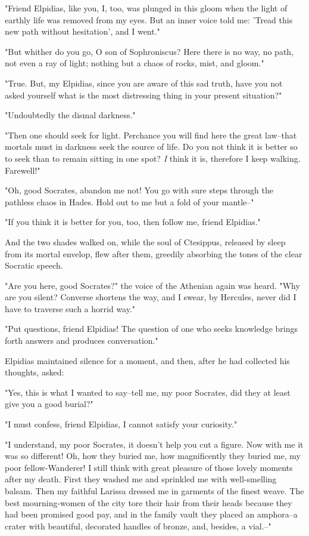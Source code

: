 "Friend Elpidias, like you, I, too, was plunged in this gloom when the
light of earthly life was removed from my eyes. But an inner voice
told me: 'Tread this new path without hesitation', and I went."

"But whither do you go, O son of Sophroniscus? Here there is no way,
no path, not even a ray of light; nothing but a chaos of rocks, mist,
and gloom."

"True. But, my Elpidias, since you are aware of this sad truth, have
you not asked yourself what is the most distressing thing in your
present situation?"

"Undoubtedly the dismal darkness."

"Then one should seek for light. Perchance you will find here the
great law--that mortals must in darkness seek the source of life. Do
you not think it is better so to seek than to remain sitting in one
spot? \emph{I} think it is, therefore I keep walking. Farewell!"

"Oh, good Socrates, abandon me not! You go with sure steps through the
pathless chaos in Hades. Hold out to me but a fold of your mantle--"

"If you think it is better for you, too, then follow me, friend
Elpidias."

And the two shades walked on, while the soul of Ctesippus, released by
sleep from its mortal envelop, flew after them, greedily absorbing the
tones of the clear Socratic speech.

"Are you here, good Socrates?" the voice of the Athenian again was
heard. "Why are you silent? Converse shortens the way, and I swear, by
Hercules, never did I have to traverse such a horrid way."

"Put questions, friend Elpidias! The question of one who seeks
knowledge brings forth answers and produces conversation."

Elpidias maintained silence for a moment, and then, after he had
collected his thoughts, asked:

"Yes, this is what I wanted to say--tell me, my poor Socrates, did
they at least give you a good burial?"

"I must confess, friend Elpidias, I cannot satisfy your curiosity."

"I understand, my poor Socrates, it doesn't help you cut a figure. Now
with me it was so different! Oh, how they buried me, how magnificently
they buried me, my poor fellow-Wanderer! I still think with great
pleasure of those lovely moments after my death. First they washed me
and sprinkled me with well-smelling balsam. Then my faithful Larissa
dressed me in garments of the finest weave. The best mourning-women of
the city tore their hair from their heads because they had been
promised good pay, and in the family vault they placed an amphora--a
crater with beautiful, decorated handles of bronze, and, besides, a
vial.--"


